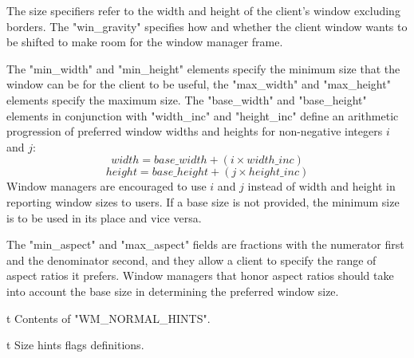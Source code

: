 The size specifiers refer to the width and height of the client's window excluding borders.
The "win_gravity" specifies how and whether the client window wants to be shifted to make room for the window manager frame.

The "min_width" and "min_height" elements specify the minimum size that the window can be for the client to be useful,
the "max_width" and "max_height" elements specify the maximum size.
The "base_width" and "base_height" elements in conjunction with "width_inc" and "height_inc" define an arithmetic
progression of preferred window widths and heights for non-negative integers $i$ and $j$:
$$width = base\_width + ( i \times width\_inc )$$
$$height = base\_height + ( j \times height\_inc )$$
Window managers are encouraged to use $i$ and $j$ instead of width and height in reporting window sizes to users.
If a base size is not provided, the minimum size is to be used in its place and vice versa.

The "min_aspect" and "max_aspect" fields are fractions with the numerator first and the denominator second, and they allow a client to specify the range of aspect ratios it prefers.
Window managers that honor aspect ratios should take into account the base size in determining the preferred window size.

\midinsert {}
\caption/t Contents of {"WM_NORMAL_HINTS"}.
\endinsert

\midinsert {}
\caption/t Size hints flags definitions.
\endinsert

